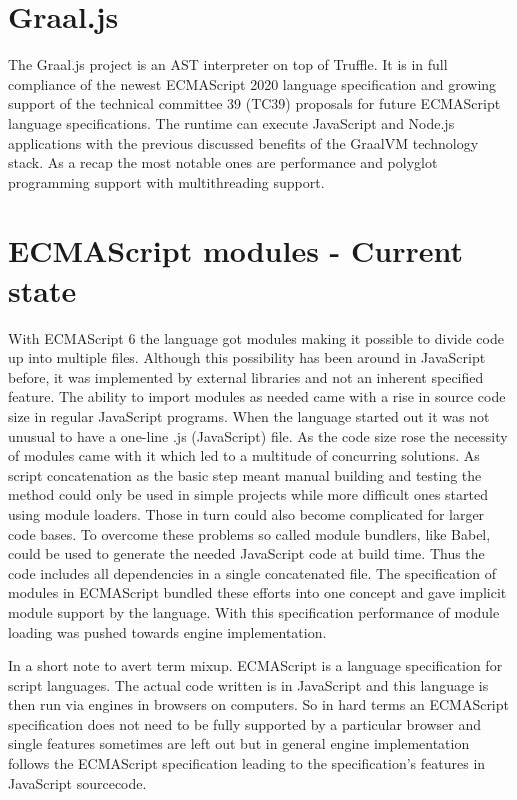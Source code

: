 \section{Graal.js}
The Graal.js project is an AST interpreter on top of Truffle. It is in full compliance of the newest ECMAScript 2020 language specification \cite{kangax1, GraaljsComp} and growing support of the technical committee 39 (TC39) proposals for future ECMAScript language specifications. \cite{kangax2, gitTC}  The runtime can execute JavaScript and Node.js applications with the previous discussed benefits of the GraalVM technology stack. \cite{Graaljs} As a recap the most notable ones are performance and polyglot programming support with multithreading support.

\section{ECMAScript modules - Current state}
With ECMAScript 6 the language got modules making it possible to divide code up into multiple files. Although this possibility has been around in JavaScript before, it was implemented by external libraries and not an inherent specified feature. The ability to import modules as needed came with a rise in source code size in regular JavaScript programs. When the language started out it was not unusual to have a one-line .js (JavaScript) file. As the code size rose the necessity of modules came with it which led to a multitude of concurring solutions. As script concatenation as the basic step meant manual building and testing the method could only be used in simple projects while more difficult ones started using module loaders. Those in turn could also become complicated for larger code bases. To overcome these problems so called module bundlers, like Babel, could be used to generate the needed JavaScript code at build time. Thus the code includes all dependencies in a single concatenated file. The specification of modules in ECMAScript bundled these efforts into one concept and gave implicit module support by the language. With this specification performance of module loading was pushed towards engine implementation.

In a short note to avert term mixup. ECMAScript is a language specification for script languages. The actual code written is in JavaScript and this language is then run via engines in browsers on computers. So in hard terms an ECMAScript specification does not need to be fully supported by a particular browser and single features sometimes are left out but in general engine implementation follows the ECMAScript specification leading to the specification's features in JavaScript sourcecode.

